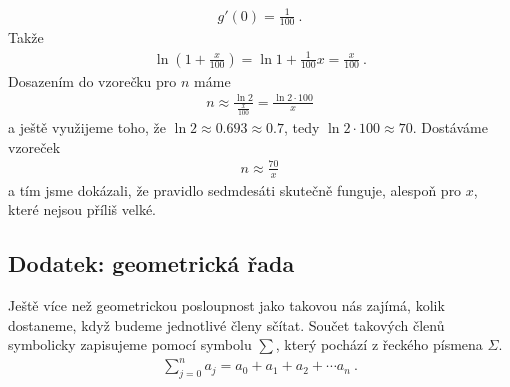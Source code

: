 \begin{example}
\begin{align}
        g'(0) = \frac{1}{100} \:.
    \end{align}
    Takže
    \begin{align}
        \ln \left(1 + \frac{x}{100}\right) = \ln 1 + \frac{1}{100} x = \frac{x}{100} \:.
    \end{align}
    Dosazením do vzorečku pro $n$ máme
    \begin{align}
        n \approx \frac{\ln 2 }{\frac{x}{100}} = \frac{\ln 2 \cdot 100}{x}
    \end{align}
    a ještě využijeme toho, že $\ln 2 \approx 0.693 \approx 0.7$, tedy $\ln 2 \cdot 100 \approx 70$. Dostáváme vzoreček
    \begin{align}
        n \approx \frac{70}{x}
    \end{align}
    a tím jsme dokázali, že pravidlo sedmdesáti skutečně funguje, alespoň pro $x$, které nejsou příliš velké.
\end{example}




\subsection*{Dodatek: geometrická řada}

Ještě více než geometrickou posloupnost jako takovou nás zajímá, kolik dostaneme, když budeme jednotlivé členy sčítat.
Součet takových členů symbolicky zapisujeme pomocí symbolu $\sum$, který pochází z řeckého písmena  $\Sigma$.
\begin{align}
    \sum_{j=0}^n a_j = a_0 + a_1 + a_2 + \cdots a_n \:.
\end{align}


